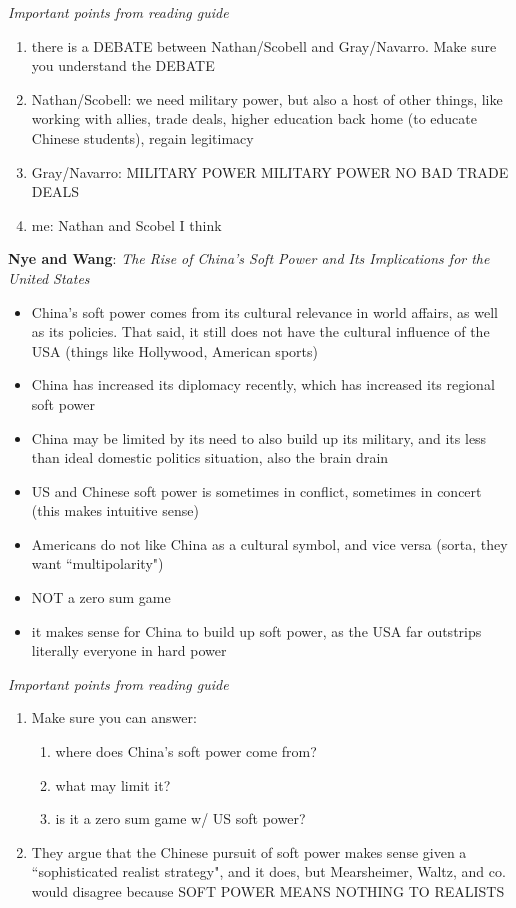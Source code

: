 \documentclass{article}
\begin{document}
\textit{Important points from reading guide}
\begin{enumerate}
    \item there is a DEBATE between Nathan/Scobell and Gray/Navarro. Make sure you understand the DEBATE
    \item Nathan/Scobell: we need military power, but also a host of other things, like working with allies, trade deals, higher education back home (to educate Chinese students), regain legitimacy
    \item Gray/Navarro: MILITARY POWER MILITARY POWER NO BAD TRADE DEALS
    \item me: Nathan and Scobel I think
\end{enumerate}
\bigskip
\textbf{Nye and Wang}: \textit{The Rise of China's Soft Power and Its Implications for the United States}
\begin{itemize}
    \item China's soft power comes from its cultural relevance in world affairs, as well as its policies. That said, it still does not have the cultural influence of the USA (things like Hollywood, American sports)
    \item China has increased its diplomacy recently, which has increased its regional soft power
    \item China may be limited by its need to also build up its military, and its less than ideal domestic politics situation, also the brain drain
    \item US and Chinese soft power is sometimes in conflict, sometimes in concert (this makes intuitive sense)
    \item Americans do not like China as a cultural symbol, and vice versa (sorta, they want ``multipolarity")
    \item NOT a zero sum game
    \item it makes sense for China to build up soft power, as the USA far outstrips literally everyone in hard power
\end{itemize}
\textit{Important points from reading guide}
\begin{enumerate}
    \item Make sure you can answer:
    \begin{enumerate}
        \item where does China's soft power come from?
        \item what may limit it?
        \item is it a zero sum game w/ US soft power?
    \end{enumerate}
    \item They argue that the Chinese pursuit of soft power makes sense given a ``sophisticated realist strategy", and it does, but Mearsheimer, Waltz, and co. would disagree because SOFT POWER MEANS NOTHING TO REALISTS
\end{enumerate}
\end{document}
